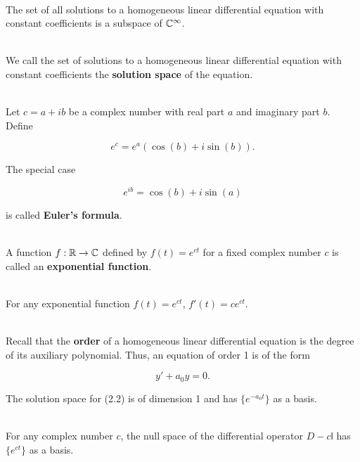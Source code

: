 \begin{corollary}
	\hfill\\
	The set of all solutions to a homogeneous linear differential equation with constant coefficients is a subspace of $\mathbb{C}^\infty$.
\end{corollary}

\begin{definition}
	\hfill\\
	We call the set of solutions to a homogeneous linear differential equation with constant coefficients the \textbf{solution space} of the equation.
\end{definition}

\begin{definition}
	\hfill\\
	Let $c = a+ib$ be a complex number with real part $a$ and imaginary part $b$. Define
	
	\[e^c = e^a(\cos(b) + i\sin(b)).\]
	
	The special case
	
	\[e^{ib} = \cos(b) + i\sin(a)\]
	
	is called \textbf{Euler's formula}.
\end{definition}

\begin{definition}
	\hfill\\
	A function $f: \mathbb{R} \to \mathbb{C}$ defined by $f(t) = e^{ct}$ for a fixed complex number $c$ is called an \textbf{exponential function}.
\end{definition}

\begin{theorem}
	\hfill\\
	For any exponential function $f(t) = e^{ct}$, $f'(t) = ce^{ct}$.
\end{theorem}

\begin{theorem}
	\hfill\\
	Recall that the \textbf{order} of a homogeneous linear differential equation is the degree of its auxiliary polynomial. Thus, an equation of order 1 is of the form
	
	\begin{equation}
		y' + a_0y = 0.
	\end{equation}
	
	The solution space for (2.2) is of dimension 1 and has $\{e^{-a_0t}\}$ as a basis.
\end{theorem}

\begin{corollary}
	\hfill\\
	For any complex number $c$, the null space of the differential operator $D-c\mathsf{l}$ has $\{e^{ct}\}$ as a basis.
\end{corollary}


